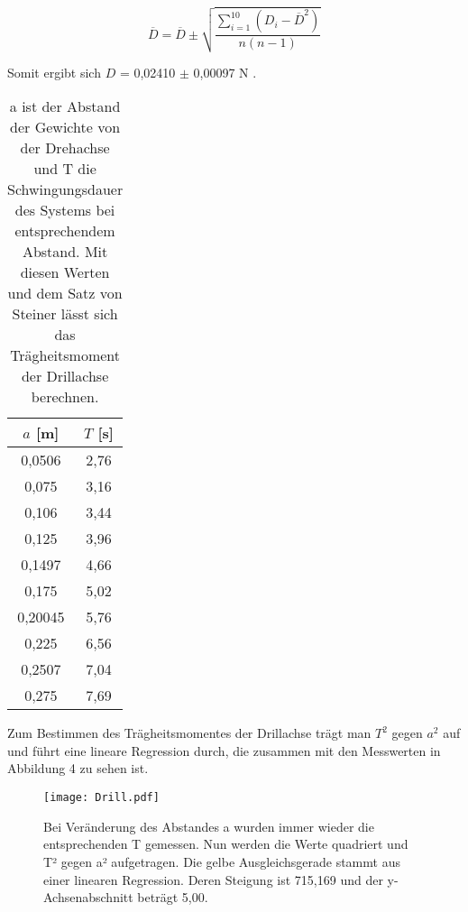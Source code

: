 \documentclass[titlepage = firstcover]{scrartcl}
\begin{document}
      \begin{equation}
        \overline{D} = \overline{D} \pm \sqrt{\frac{\sum_{i=1}^{10}(D_i - \overline{D}^2)}{n(n-1)}}
      \end{equation}

      Somit ergibt sich $D$ = 0,02410 $\pm$ 0,00097 N .
      \begin{table}[h]
        \centering
        \caption{a ist der Abstand der Gewichte von der Drehachse und T die Schwingungsdauer des Systems bei entsprechendem Abstand. Mit diesen Werten und dem Satz von Steiner lässt sich das Trägheitsmoment der Drillachse berechnen.}
        \label{tab:Tabelle_2}
        
        \begin{tabular}{c c}
          \toprule
          {$a$ [m]} & {$T$ [s]} \\
          \midrule
          0,0506 & 2,76 \\
          0,075 & 3,16 \\
          0,106 & 3,44 \\
          0,125 & 3,96 \\
          0,1497 & 4,66 \\
          0,175 & 5,02 \\
          0,20045 & 5,76 \\
          0,225 & 6,56 \\
          0,2507 & 7,04 \\
          0,275 & 7,69 \\
          \bottomrule
        \end{tabular}
      \end{table}
      
      Zum Bestimmen des Trägheitsmomentes der Drillachse trägt man $T^2$ gegen $a^2$ auf und führt eine lineare Regression durch, die zusammen mit den Messwerten
      in Abbildung 4 zu sehen ist. \newline

      \begin{figure}[h]
        \centering
        \texttt{[image: Drill.pdf]}
        \caption{Bei Veränderung des Abstandes a wurden immer wieder die entsprechenden T gemessen. Nun werden die Werte quadriert und T² gegen a² aufgetragen. Die gelbe Ausgleichsgerade stammt aus einer linearen Regression. Deren Steigung ist 715,169 und der y-Achsenabschnitt beträgt 5,00.}
      \end{figure}
      
\end{document}
